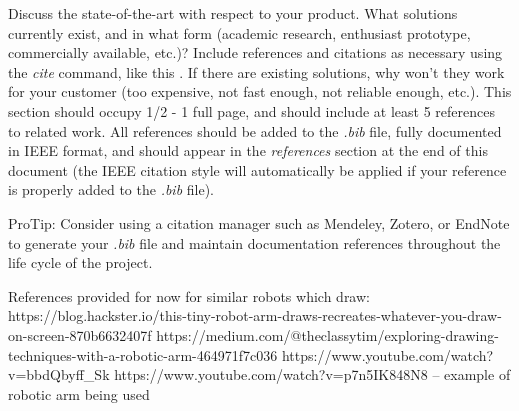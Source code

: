 Discuss the state-of-the-art with respect to your product. What solutions currently exist, and in what form (academic research, enthusiast prototype,
commercially available, etc.)? Include references and citations as necessary using the \textit{cite} command,
like this \cite{Rubin2012}. If there are existing solutions, why won't they work for your customer (too expensive,
not fast enough, not reliable enough, etc.). This section should occupy 1/2 - 1 full page, and should include at least 5 references to related work.
All references should be added to the \textit{.bib} file, fully documented in IEEE format, and should appear in the \textit{references}
section at the end of this document (the IEEE citation style will automatically be applied if your reference is properly added to the \textit{.bib} file).

ProTip: Consider using a citation manager such as Mendeley, Zotero, or EndNote to
generate your \textit{.bib} file and maintain documentation references throughout the life cycle of the project.


References provided for now for similar robots which draw: 
https://blog.hackster.io/this-tiny-robot-arm-draws-recreates-whatever-you-draw-on-screen-870b6632407f
https://medium.com/@theclassytim/exploring-drawing-techniques-with-a-robotic-arm-464971f7c036
https://www.youtube.com/watch?v=bbdQbyff_Sk 
https://www.youtube.com/watch?v=p7n5IK848N8 – example of robotic arm being used

